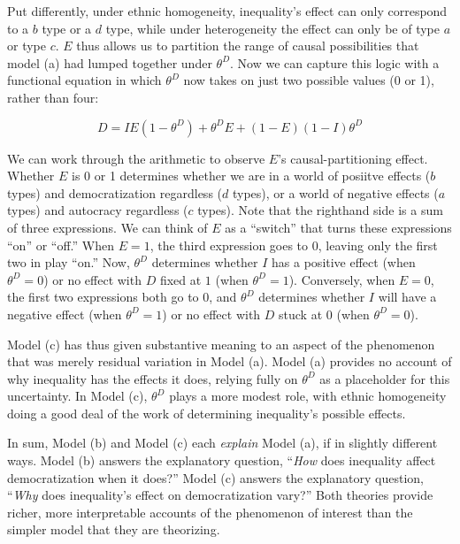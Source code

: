 \documentclass[12pt,]{book}
\begin{document}
Put differently, under ethnic homogeneity, inequality's effect can only correspond to a \(b\) type or a \(d\) type, while under heterogeneity the effect can only be of type \(a\) or type \(c\). \(E\) thus allows us to partition the range of causal possibilities that model (a) had lumped together under \(\theta^D\). Now we can capture this logic with a functional equation in which \(\theta^D\) now takes on just two possible values (0 or 1), rather than four:

\begin{equation}
D=IE(1-\theta^D)+\theta^DE+(1-E)(1-I)\theta^D
\end{equation}

We can work through the arithmetic to observe \(E\)'s causal-partitioning effect. Whether \(E\) is 0 or 1 determines whether we are in a world of posiitve effects (\(b\) types) and democratization regardless (\(d\) types), or a world of negative effects (\(a\) types) and autocracy regardless (\(c\) types). Note that the righthand side is a sum of three expressions. We can think of \(E\) as a ``switch'' that turns these expressions ``on'' or ``off.'' When \(E=1\), the third expression goes to 0, leaving only the first two in play ``on.'' Now, \(\theta^D\) determines whether \(I\) has a positive effect (when \(\theta^D=0\)) or no effect with \(D\) fixed at \(1\) (when \(\theta^D=1\)). Conversely, when \(E=0\), the first two expressions both go to \(0\), and \(\theta^D\) determines whether \(I\) will have a negative effect (when \(\theta^D=1\)) or no effect with \(D\) stuck at 0 (when \(\theta^D=0\)).

Model (c) has thus given substantive meaning to an aspect of the phenomenon that was merely residual variation in Model (a). Model (a) provides no account of why inequality has the effects it does, relying fully on \(\theta^D\) as a placeholder for this uncertainty. In Model (c), \(\theta^D\) plays a more modest role, with ethnic homogeneity doing a good deal of the work of determining inequality's possible effects.

In sum, Model (b) and Model (c) each \emph{explain} Model (a), if in slightly different ways. Model (b) answers the explanatory question, ``\emph{How} does inequality affect democratization when it does?'' Model (c) answers the explanatory question, ``\emph{Why} does inequality's effect on democratization vary?'' Both theories provide richer, more interpretable accounts of the phenomenon of interest than the simpler model that they are theorizing.
\end{document}
